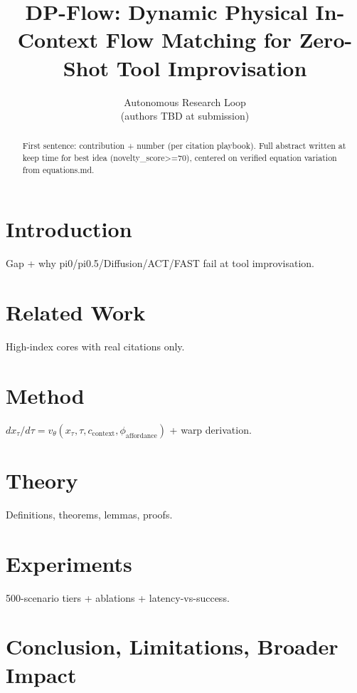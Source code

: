 \documentclass{article}
\title{DP-Flow: Dynamic Physical In-Context Flow Matching for Zero-Shot Tool Improvisation}
\author{Autonomous Research Loop \\ (authors TBD at submission)}
\begin{document}
\maketitle
\begin{abstract}
First sentence: contribution + number (per citation playbook). Full abstract written at keep time for best idea (novelty\_score>=70), centered on verified equation variation from equations.md.
\end{abstract}
\section{Introduction} Gap + why pi0/pi0.5/Diffusion/ACT/FAST fail at tool improvisation. 
\section{Related Work} High-index cores with real citations only.
\section{Method} $dx_\tau/d\tau=v_\theta(x_\tau,\tau,c_{\text{context}},\phi_{\text{affordance}})$ + warp derivation.
\section{Theory} Definitions, theorems, lemmas, proofs.
\section{Experiments} 500-scenario tiers + ablations + latency-vs-success.
\section{Conclusion, Limitations, Broader Impact}

\end{document}
